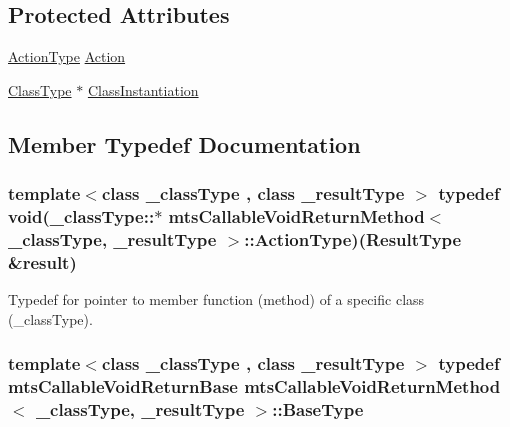 \subsection*{Protected Attributes}
\begin{DoxyCompactItemize}
\item 
\hyperlink{classmts_callable_void_return_method_a7f1f533b8d1e55b4b35d03dc80017101}{Action\-Type} \hyperlink{classmts_callable_void_return_method_ae6e1e00e4a13c6e6a6047323adf7707d}{Action}
\item 
\hyperlink{classmts_callable_void_return_method_a2bea77e5dd239ec2a1d3558dd3ca1776}{Class\-Type} $\ast$ \hyperlink{classmts_callable_void_return_method_a38ecd87e4473a2f42fde5567cd637937}{Class\-Instantiation}
\end{DoxyCompactItemize}


\subsection{Member Typedef Documentation}
\hypertarget{classmts_callable_void_return_method_a7f1f533b8d1e55b4b35d03dc80017101}{
\subsubsection[{Action\-Type}]{\setlength{\rightskip}{0pt plus 5cm}template$<$class \-\_\-class\-Type , class \-\_\-result\-Type $>$ typedef void(\-\_\-class\-Type\-::$\ast$ {\bf mts\-Callable\-Void\-Return\-Method}$<$ \-\_\-class\-Type, \-\_\-result\-Type $>$\-::Action\-Type)({\bf Result\-Type} \&result)}}\label{classmts_callable_void_return_method_a7f1f533b8d1e55b4b35d03dc80017101}
Typedef for pointer to member function (method) of a specific class (\-\_\-class\-Type). \hypertarget{classmts_callable_void_return_method_a01907ccc09041bebecb2085a84f74bb1}{
\subsubsection[{Base\-Type}]{\setlength{\rightskip}{0pt plus 5cm}template$<$class \-\_\-class\-Type , class \-\_\-result\-Type $>$ typedef {\bf mts\-Callable\-Void\-Return\-Base} {\bf mts\-Callable\-Void\-Return\-Method}$<$ \-\_\-class\-Type, \-\_\-result\-Type $>$\-::{\bf Base\-Type}}}\label{classmts_callable_void_return_method_a01907ccc09041bebecb2085a84f74bb1}
